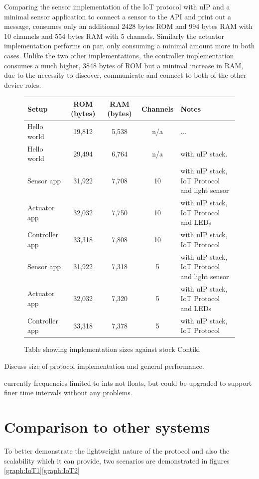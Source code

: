 Comparing the sensor implementation of the IoT protocol with uIP and a minimal sensor application to connect a sensor to the API and print out a message, consumes only an additional 2428 bytes ROM and 994 bytes RAM with 10 channels and 554 bytes RAM with 5 channels.
Similarly the actuator implementation performs on par, only consuming a minimal amount more in both cases. Unlike the two other implementations, the controller implementation consumes a much higher, 3848 bytes of ROM but a minimal increase in RAM, due to the necessity to discover, communicate and connect to both of the other device roles.
\begin{figure}[h]
\begin{center}
    \begin{tabular}{| l | c | c | c | l |}
    \hline
    Setup & ROM (bytes) & RAM (bytes) & Channels & Notes \\ \hline
    Hello world & 19,812 & 5,538 & n/a &... \\ \hline
    Hello world & 29,494 & 6,764 & n/a & with uIP stack. \\ \hline
    Sensor app & 31,922 & 7,708 & 10 & with uIP stack, IoT Protocol and light sensor\\ \hline
    Actuator app & 32,032 & 7,750 & 10 & with uIP stack, IoT Protocol and LEDs \\ \hline
    Controller app & 33,318 & 7,808 & 10 & with uIP stack, IoT Protocol \\ \hline
    Sensor app & 31,922 & 7,318 & 5 & with uIP stack, IoT Protocol and light sensor\\ \hline
    Actuator app & 32,032 & 7,320 & 5 & with uIP stack, IoT Protocol and LEDs \\ \hline
    Controller app & 33,318 & 7,378 & 5 & with uIP stack, IoT Protocol \\ 
    \hline
    \end{tabular}
\end{center}
\caption{Table showing implementation sizes against stock Contiki}
\label{tab:size}
\end{figure}



Discuss size of protocol implementation and general performance.

currently frequencies limited to ints not floats, but could be upgraded to support finer time intervals without any problems.

\section{Comparison to other systems} %
\label{sec:comparison_to_other_systems}
To better demonstrate the lightweight nature of the protocol and also the scalability which it can provide, two scenarios are demonstrated in figures \ref{graph:IoT1}\ref{graph:IoT2}
